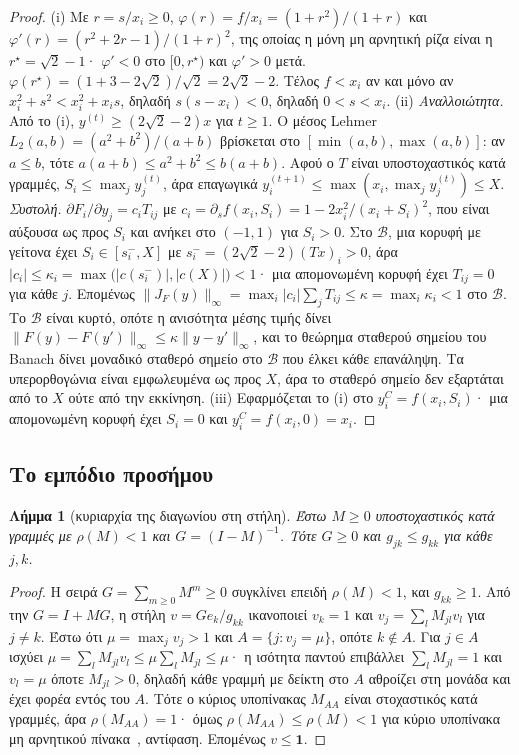 \documentclass[11pt,a4paper]{article}
\newtheorem{lemma}{Λήμμα}
\theoremstyle{definition}
\theoremstyle{plain}
\newcommand{\one}{\mathbf{1}}
\begin{document}
\begin{proof}
(i) Με $r=s/x_i\ge0$, $\varphi(r)=f/x_i=(1+r^2)/(1+r)$ και $\varphi'(r)=(r^2+2r-1)/(1+r)^2$, της οποίας η μόνη μη αρνητική ρίζα είναι η $r^\star=\sqrt2-1$· $\varphi'<0$ στο $[0,r^\star)$ και $\varphi'>0$ μετά. $\varphi(r^\star)=(1+3-2\sqrt2)/\sqrt2=2\sqrt2-2$. Τέλος $f<x_i$ αν και μόνο αν $x_i^2+s^2<x_i^2+x_is$, δηλαδή $s(s-x_i)<0$, δηλαδή $0<s<x_i$.
(ii) \emph{Αναλλοιώτητα.} Από το (i), $y^{(t)}\ge(2\sqrt2-2)x$ για $t\ge1$. Ο μέσος Lehmer $L_2(a,b)=(a^2+b^2)/(a+b)$ βρίσκεται στο $[\min(a,b),\max(a,b)]$: αν $a\le b$, τότε $a(a+b)\le a^2+b^2\le b(a+b)$. Αφού ο $T$ είναι υποστοχαστικός κατά γραμμές, $S_i\le\max_jy_j^{(t)}$, άρα επαγωγικά $y^{(t+1)}_i\le\max(x_i,\max_jy_j^{(t)})\le X$. \emph{Συστολή.} $\partial F_i/\partial y_j=c_iT_{ij}$ με $c_i=\partial_sf(x_i,S_i)=1-2x_i^2/(x_i+S_i)^2$, που είναι αύξουσα ως προς $S_i$ και ανήκει στο $(-1,1)$ για $S_i>0$. Στο $\mathcal B$, μια κορυφή με γείτονα έχει $S_i\in[s_i^-,X]$ με $s_i^-=(2\sqrt2-2)(Tx)_i>0$, άρα $|c_i|\le\kappa_i=\max\big(|c(s_i^-)|,|c(X)|\big)<1$· μια απομονωμένη κορυφή έχει $T_{ij}=0$ για κάθε $j$. Επομένως $\|J_F(y)\|_\infty=\max_i|c_i|\sum_jT_{ij}\le\kappa=\max_i\kappa_i<1$ στο $\mathcal B$. Το $\mathcal B$ είναι κυρτό, οπότε η ανισότητα μέσης τιμής δίνει $\|F(y)-F(y')\|_\infty\le\kappa\|y-y'\|_\infty$, και το θεώρημα σταθερού σημείου του Banach δίνει μοναδικό σταθερό σημείο στο $\mathcal B$ που έλκει κάθε επανάληψη. Τα υπερορθογώνια είναι εμφωλευμένα ως προς $X$, άρα το σταθερό σημείο δεν εξαρτάται από το $X$ ούτε από την εκκίνηση. (iii) Εφαρμόζεται το (i) στο $y^C_i=f(x_i,S_i)$· μια απομονωμένη κορυφή έχει $S_i=0$ και $y^C_i=f(x_i,0)=x_i$.
\end{proof}

\subsection{Το εμπόδιο προσήμου}

\begin{lemma}[κυριαρχία της διαγωνίου στη στήλη]\label{lem:column}
Έστω $M\ge0$ υποστοχαστικός κατά γραμμές με $\rho(M)<1$ και $G=(I-M)^{-1}$. Τότε $G\ge0$ και $g_{jk}\le g_{kk}$ για κάθε $j,k$.
\end{lemma}

\begin{proof}
Η σειρά $G=\sum_{m\ge0}M^m\ge0$ συγκλίνει επειδή $\rho(M)<1$, και $g_{kk}\ge1$. Από την $G=I+MG$, η στήλη $v=Ge_k/g_{kk}$ ικανοποιεί $v_k=1$ και $v_j=\sum_lM_{jl}v_l$ για $j\ne k$. Έστω ότι $\mu=\max_jv_j>1$ και $A=\{j:v_j=\mu\}$, οπότε $k\notin A$. Για $j\in A$ ισχύει $\mu=\sum_lM_{jl}v_l\le\mu\sum_lM_{jl}\le\mu$· η ισότητα παντού επιβάλλει $\sum_lM_{jl}=1$ και $v_l=\mu$ όποτε $M_{jl}>0$, δηλαδή κάθε γραμμή με δείκτη στο $A$ αθροίζει στη μονάδα και έχει φορέα εντός του $A$. Τότε ο κύριος υποπίνακας $M_{AA}$ είναι στοχαστικός κατά γραμμές, άρα $\rho(M_{AA})=1$· όμως $\rho(M_{AA})\le\rho(M)<1$ για κύριο υποπίνακα μη αρνητικού πίνακα~\cite{hornjohnson13}, αντίφαση. Επομένως $v\le\one$.
\end{proof}
\end{document}
